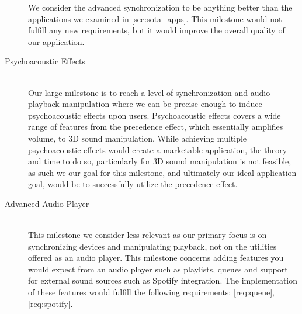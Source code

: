 \begin{description}
        We consider the advanced synchronization to be anything better than the applications we examined in \cref{sec:sota_apps}.
        This milestone would not fulfill any new requirements, but it would improve the overall quality of our application.
    \item [Psychoacoustic Effects] \hfill \\
        Our large milestone is to reach a level of synchronization and audio playback manipulation where we can be precise enough to induce psychoacoustic effects upon users.
        Psychoacoustic effects covers a wide range of features from the precedence effect, which essentially amplifies volume, to 3D sound manipulation.
        While achieving multiple psychoacoustic effects would create a marketable application, the theory and time to do so, particularly for 3D sound manipulation is not feasible, as such we our goal for this milestone, and ultimately our ideal application goal, would be to successfully utilize the precedence effect.
    \item [Advanced Audio Player] \hfill \\
        This milestone we consider less relevant as our primary focus is on synchronizing devices and manipulating playback, not on the utilities offered as an audio player.
        This milestone concerns adding features you would expect from an audio player such as playlists, queues and support for external sound sources such as Spotify integration.
        The implementation of these features would fulfill the following requirements: \ref{req:queue}, \ref{req:spotify}.
\end{description}





